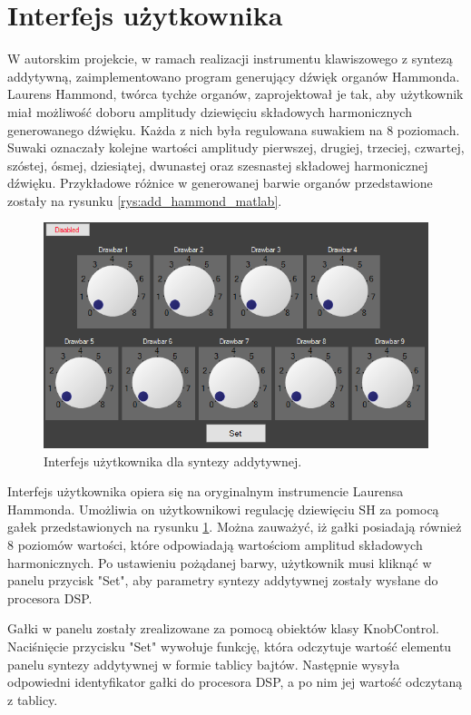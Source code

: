\section{Interfejs użytkownika}
W autorskim projekcie, w ramach realizacji instrumentu klawiszowego z syntezą addytywną, zaimplementowano program generujący dźwięk organów Hammonda. 
Laurens Hammond, twórca tychże organów, zaprojektował je tak, aby użytkownik miał możliwość doboru amplitudy dziewięciu składowych harmonicznych generowanego dźwięku. Każda z nich była regulowana suwakiem na 8 poziomach. Suwaki oznaczały kolejne wartości amplitudy pierwszej, drugiej, trzeciej, czwartej, szóstej, ósmej, dziesiątej, dwunastej oraz szesnastej składowej harmonicznej dźwięku. Przykładowe różnice w generowanej barwie organów przedstawione zostały na rysunku \ref{rys:add_hammond_matlab}.
\begin{figure}[H]
	\centering
	\includegraphics[width=15cm]{grafiki/add_interface}
	\captionsetup{justification=centering}
	\caption{Interfejs użytkownika dla syntezy addytywnej.}
	\label{rys:add_interface}
\end{figure}

Interfejs użytkownika opiera się na oryginalnym instrumencie Laurensa Hammonda. Umożliwia on użytkownikowi regulację dziewięciu SH za pomocą gałek przedstawionych na rysunku \ref{rys:add_interface}. Można zauważyć, iż gałki posiadają również 8 poziomów wartości, które odpowiadają wartościom amplitud składowych harmonicznych. Po ustawieniu pożądanej barwy, użytkownik musi kliknąć w panelu przycisk "Set", aby parametry syntezy addytywnej zostały wysłane do procesora DSP.

Gałki w panelu zostały zrealizowane za pomocą obiektów klasy KnobControl. Naciśnięcie przycisku "Set" wywołuje funkcję, która odczytuje wartość elementu panelu syntezy addytywnej w formie tablicy bajtów. Następnie wysyła odpowiedni identyfikator gałki do procesora DSP, a po nim jej wartość odczytaną z tablicy.


